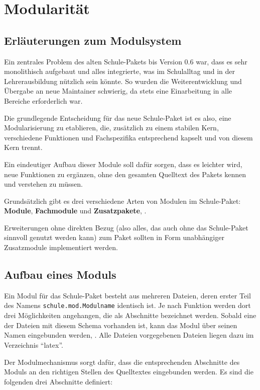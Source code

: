 \section{Modularität}
	\label{sec:devmodule}
	\subsection{Erläuterungen zum Modulsystem}
	Ein zentrales Problem des alten Schule-Pakets bis Version 0.6
	war, dass es sehr monolithisch aufgebaut und alles integrierte,
	was im Schulalltag und in der Lehrerausbildung nützlich sein
	könnte. So wurden die Weiterentwicklung und Übergabe an neue
	Maintainer schwierig, da stets eine Einarbeitung in alle Bereiche
	erforderlich war.

	Die grundlegende Entscheidung für das neue Schule-Paket ist es
	also, eine Modularisierung zu etablieren, die, zusätzlich zu
	einem stabilen Kern, verschiedene Funktionen und Fachspezifika
	entsprechend kapselt und von diesem Kern trennt.

	Ein eindeutiger Aufbau dieser Module soll dafür sorgen, dass es
	leichter wird, neue Funktionen zu ergänzen, ohne den gesamten
	Quelltext des Pakets kennen und verstehen zu müssen.

	Grundsätzlich gibt es drei verschiedene Arten von Modulen im
	Schule-Paket: \textbf{Module}, \textbf{Fachmodule} und
	\textbf{Zusatzpakete}, \vgl\space {}.

	Erweiterungen ohne direkten Bezug (also alles, das auch ohne das
	Schule-Paket sinnvoll genutzt werden kann) zum Paket sollten in
	Form unabhängiger Zusatzmodule implementiert werden.

	\subsection{Aufbau eines Moduls}

	\label{sec:devmoduleModul}

    Ein Modul für das Schule-Paket besteht aus mehreren Dateien, deren erster Teil des Namens \texttt{schule.mod.Modulname} identisch ist. Je nach Funktion werden dort drei Möglichkeiten angehangen, die als Abschnitte bezeichnet werden. Sobald eine der Dateien mit diesem Schema vorhanden ist, kann das Modul über seinen Namen eingebunden werden, \vgl\space{}. Alle Dateien vorgegebenen Dateien liegen dazu im Verzeichnis \enquote{latex}.

    Der Modulmechanismus sorgt dafür, dass die entsprechenden Abschnitte des Moduls an den richtigen Stellen des Quelltextes eingebunden werden. Es sind die folgenden drei Abschnitte definiert:

